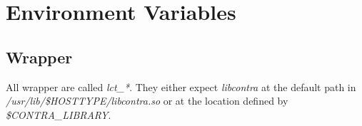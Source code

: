\documentclass{book}
\begin{document}
\chapter{Environment Variables}

\section*{Wrapper}

All wrapper are called \textit{lct\_*}. They either expect \textit{libcontra} 
at the default path in \textit{/usr/lib/\$HOSTTYPE/libcontra.so} or at the 
location defined by \textit{\$CONTRA\_LIBRARY}. 
\end{document}
